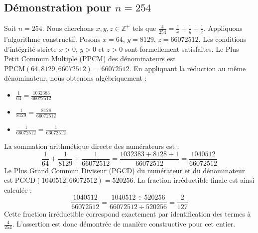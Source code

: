\documentclass[11pt,a4paper]{article}
\begin{document}
\subsection{Démonstration pour $n = 254$}
Soit $n = 254$. Nous cherchons $x, y, z \in \mathbb{Z}^{+}$ tels que $\frac{4}{254} = \frac{1}{x} + \frac{1}{y} + \frac{1}{z}$.
Appliquons l'algorithme constructif. Posons $x = 64$, $y = 8129$, $z = 66072512$.
Les conditions d'intégrité stricte $x > 0$, $y > 0$ et $z > 0$ sont formellement satisfaites.
Le Plus Petit Commun Multiple (PPCM) des dénominateurs est $\text{PPCM}(64, 8129, 66072512) = 66072512$.
En appliquant la réduction au même dénominateur, nous obtenons algébriquement :
\begin{itemize}
    \item $\frac{1}{64} = \frac{1032383}{66072512}$
    \item $\frac{1}{8129} = \frac{8128}{66072512}$
    \item $\frac{1}{66072512} = \frac{1}{66072512}$
\end{itemize}
La sommation arithmétique directe des numérateurs est :
$$ \frac{1}{64} + \frac{1}{8129} + \frac{1}{66072512} = \frac{1032383 + 8128 + 1}{66072512} = \frac{1040512}{66072512} $$
Le Plus Grand Commun Diviseur (PGCD) du numérateur et du dénominateur est $\text{PGCD}(1040512, 66072512) = 520256$.
La fraction irréductible finale est ainsi calculée :
$$ \frac{1040512}{66072512} = \frac{1040512 \div 520256}{66072512 \div 520256} = \frac{2}{127} $$
Cette fraction irréductible correspond exactement par identification des termes à $\frac{4}{254}$. L'assertion est donc démontrée de manière constructive pour cet entier.
\end{document}
